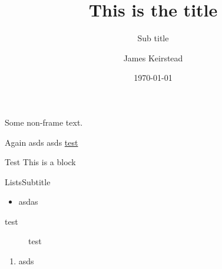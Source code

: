 
\title{This is the title}
\subtitle{Sub title}
\date{\today}
\author{James Keirstead}



\begin{frame}
\maketitle
\end{frame}

Some non-frame text.
\begin{frame}{Again}
asds \pause
asds \url{test}

\begin{block}{Test}
This is a block
\end{block}
\end{frame}

\begin{frame}{Lists}{Subtitle}
\begin{itemize}
\item asdas
\end{itemize}

\begin{description}
\item [test] test
\end{description}

\begin{enumerate}
\item asds
\end{enumerate}
\end{frame}




